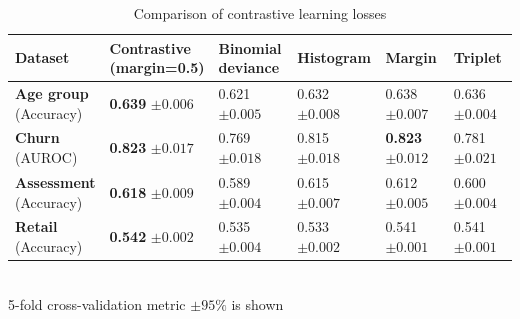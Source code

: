 \documentclass{article}
\begin{document}
\begin{table}
\centering
\caption{Comparison of contrastive learning losses}
\begin{tabular}{llllll}
\toprule
\textbf{Dataset} & \makecell{\textbf{Contrastive} \\ (margin=0.5)} & \makecell{\textbf{Binomial} \\ \textbf{deviance}} & \textbf{Histogram} & \textbf{Margin} & \textbf{Triplet} \\
\midrule
\makecell{\textbf{Age group} \\ \small{(Accuracy)}} & \makecell{\textbf{0.639} \\ $\pm 0.006$} & \makecell{0.621 \\ $\pm 0.005$} & \makecell{0.632 \\ $\pm 0.008$} & \makecell{0.638 \\ $\pm 0.007$} & \makecell{0.636 \\ $\pm 0.004$} \\
\makecell{\textbf{Churn} \\ \small{(AUROC)}} & \makecell{\textbf{0.823} \\ $\pm 0.017$} & \makecell{0.769 \\ $\pm 0.018$} & \makecell{0.815 \\ $\pm 0.018$} & \makecell{\textbf{0.823} \\ $\pm 0.012$} & \makecell{0.781 \\ $\pm 0.021$} \\
\makecell{\textbf{Assessment} \\ \small{(Accuracy)}} & \makecell{\textbf{0.618} \\ $\pm 0.009$} & \makecell{0.589 \\ $\pm 0.004$} & \makecell{0.615 \\ $\pm 0.007$} & \makecell{0.612 \\ $\pm 0.005$} & \makecell{0.600 \\ $\pm 0.004$} \\
\makecell{\textbf{Retail} \\ \small{(Accuracy)}} & \makecell{\textbf{0.542} \\ $\pm 0.002$} & \makecell{0.535 \\ $\pm 0.004$} & \makecell{0.533 \\ $\pm 0.002$} & \makecell{0.541 \\ $\pm 0.001$} & \makecell{0.541 \\ $\pm 0.001$} \\
\bottomrule
\end{tabular} \\
\small{5-fold cross-validation metric $\pm 95\%$ is shown}
\label{tab-loss-type}
\end{table}
\end{document}
